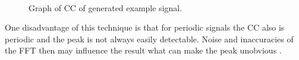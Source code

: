 \begin{figure}[ht]
    \centering
    \\
    \caption[\ac{CC} of generated example signal.]
            {Graph of \ac{CC} of generated example signal.}
    \label{fig:03_ccTheory}
\end{figure}
One disadvantage of this technique is that for periodic signals the \ac{CC} also is periodic
and the peak is not always easily detectable. Noise and inaccuracies of the \ac{FFT} then
may influence the result what can make the peak unobvious \cite{L_L_GCC}.